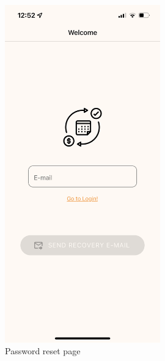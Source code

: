 \documentclass[11pt]{article}
\begin{document}
\begin{figure}[h!]
\begin{minipage}[c]{0.45\textwidth}
        \includegraphics[width=0.6\textwidth, clip]{../../assets/smartphone/forgot.PNG}
        \caption{Password reset page}
        \label{fig:forgot}
    \end{minipage}
\end{figure}
\end{document}
